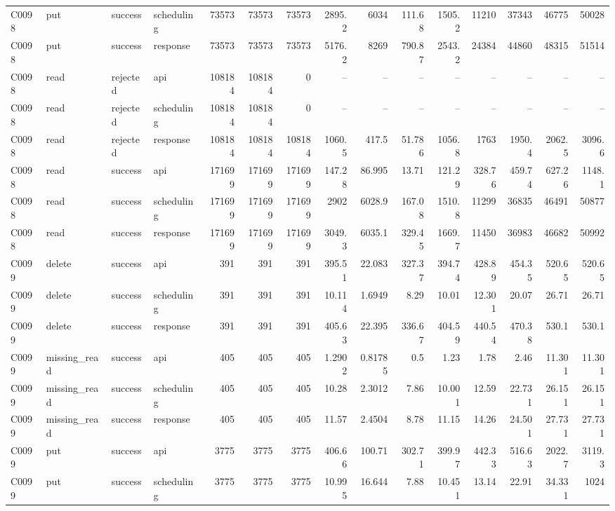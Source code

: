 \begin{landscape}
\begin{longtable}{llllrrrrrrrrrrr}
C0098 & put & success & scheduling & 73573 & 73573 & 73573 & 2895.2 & 6034 & 111.68 & 1505.2 & 11210 & 37343 & 46775 & 50028\\
C0098 & put & success & response & 73573 & 73573 & 73573 & 5176.2 & 8269 & 790.87 & 2543.2 & 24384 & 44860 & 48315 & 51514\\
C0098 & read & rejected & api & 108184 & 108184 & 0 & -- & -- & -- & -- & -- & -- & -- & --\\
C0098 & read & rejected & scheduling & 108184 & 108184 & 0 & -- & -- & -- & -- & -- & -- & -- & --\\
C0098 & read & rejected & response & 108184 & 108184 & 108184 & 1060.5 & 417.5 & 51.786 & 1056.8 & 1763 & 1950.4 & 2062.5 & 3096.6\\
C0098 & read & success & api & 171699 & 171699 & 171699 & 147.28 & 86.995 & 13.71 & 121.29 & 328.76 & 459.74 & 627.26 & 1148.1\\
C0098 & read & success & scheduling & 171699 & 171699 & 171699 & 2902 & 6028.9 & 167.08 & 1510.8 & 11299 & 36835 & 46491 & 50877\\
C0098 & read & success & response & 171699 & 171699 & 171699 & 3049.3 & 6035.1 & 329.45 & 1669.7 & 11450 & 36983 & 46682 & 50992\\
C0099 & delete & success & api & 391 & 391 & 391 & 395.51 & 22.083 & 327.37 & 394.74 & 428.89 & 454.35 & 520.65 & 520.65\\
C0099 & delete & success & scheduling & 391 & 391 & 391 & 10.114 & 1.6949 & 8.29 & 10.01 & 12.301 & 20.07 & 26.71 & 26.71\\
C0099 & delete & success & response & 391 & 391 & 391 & 405.63 & 22.395 & 336.67 & 404.59 & 440.54 & 470.38 & 530.1 & 530.1\\
C0099 & missing\_\allowbreak{}read & success & api & 405 & 405 & 405 & 1.2902 & 0.81785 & 0.5 & 1.23 & 1.78 & 2.46 & 11.301 & 11.301\\
C0099 & missing\_\allowbreak{}read & success & scheduling & 405 & 405 & 405 & 10.28 & 2.3012 & 7.86 & 10.001 & 12.59 & 22.731 & 26.151 & 26.151\\
C0099 & missing\_\allowbreak{}read & success & response & 405 & 405 & 405 & 11.57 & 2.4504 & 8.78 & 11.15 & 14.26 & 24.501 & 27.731 & 27.731\\
C0099 & put & success & api & 3775 & 3775 & 3775 & 406.66 & 100.71 & 302.71 & 399.97 & 442.33 & 516.63 & 2022.7 & 3119.3\\
C0099 & put & success & scheduling & 3775 & 3775 & 3775 & 10.995 & 16.644 & 7.88 & 10.451 & 13.14 & 22.91 & 34.331 & 1024\\

\end{longtable}
\end{landscape}
